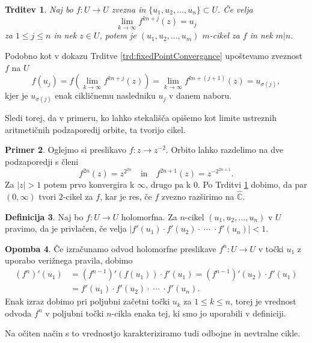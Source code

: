 \documentclass[12pt,a4paper]{amsart}
\theoremstyle{definition} %
\newtheorem{definicija}{Definicija}[section]
\newtheorem{primer}[definicija]{Primer}
\newtheorem{opomba}[definicija]{Opomba}
\theoremstyle{plain} %
\newtheorem{trditev}[definicija]{Trditev}
\newcommand{\CC}{\mathbb C}
\newcommand{\CCinf} {\hat{\CC}} %
\begin{document}
\begin{trditev}\label{trd:cycleConvergance}
Naj bo $f \colon U \to U$ zvezna in $\{u_1, u_2, \dots, u_n\} \subset U$. Če velja 
$$\lim_{k\to\infty}f^{kn + j} (z) = u_j$$
za $1 \leq j \leq n$ in nek $z\in U$, potem je $(u_1, u_2, \dots, u_m)$ $m$-cikel za $f$ in nek $m | n$.
\end{trditev}

\proof
Podobno kot v dokazu Trditve \ref{trd:fixedPointConvergance} upoštevamo zveznost $f$ na $U$
$$f(u_j) = f(\lim_{k\to\infty} f^{kn + j} (z)) = \lim_{k\to\infty} f^{kn + (j+1)} (z) = u_{\sigma(j)},$$
kjer je $u_{\sigma(j)}$ enak cikličnemu nasledniku $u_j$ v danem naboru. 
\endproof

Sledi torej, da v primeru, ko lahko stekališča opišemo kot limite ustreznih aritmetičnih podzaporedij orbite, ta tvorijo cikel.

\begin{primer}
Oglejmo si preslikavo $f \colon z \to z^{-2}$. 
Orbito lahko razdelimo na dve podzaporedji s členi
$$f^{2n}(z) = z^{2^{2n}} \quad \text{in} \quad f^{2n+1}(z) = z^{-2^{2n+1}}.$$
Za $|z| > 1$ potem prvo konvergira k $\infty$, drugo pa k $0$. Po Trditvi \ref{trd:cycleConvergance}
dobimo, da par $(0, \infty)$ tvori $2$-cikel za $f$, kar je res, če $f$ zvezno razširimo na $\CCinf$.
\end{primer}

\begin{definicija}
Naj bo $f \colon U \to U$ holomorfna. Za $n$-cikel $(u_1, u_2, \dots, u_n)$ v $U$ pravimo, da je privlačen, če velja
$|f'(u_1) \cdot f'(u_2) \cdot \; \cdots \; \cdot f'(u_n)| < 1$.
\end{definicija}

\begin{opomba}
Če izračunamo odvod holomorfne preslikave $f^n \colon U \to U$ v točki $u_1$ z uporabo verižnega pravila, dobimo
\begin{align*}
(f^n)'(u_1) &= (f^{n-1})'(f(u_1)) \cdot f'(u_1) = (f^{n-1})'(u_2) \cdot f'(u_1) \\
&= f'(u_1)\cdot f'(u_2) \cdot \; \cdots \; \cdot f'(u_n).
\end{align*}
Enak izraz dobimo pri poljubni začetni točki $u_k$ za $1 \leq k \leq n$, 
torej je vrednost odvoda $f^n$ v poljubni točki $n$-cikla enaka tej, ki smo jo uporabili v definiciji.

\noindent Na očiten način s to vrednostjo karakteriziramo tudi odbojne in nevtralne cikle.
\end{opomba}
\end{document}
